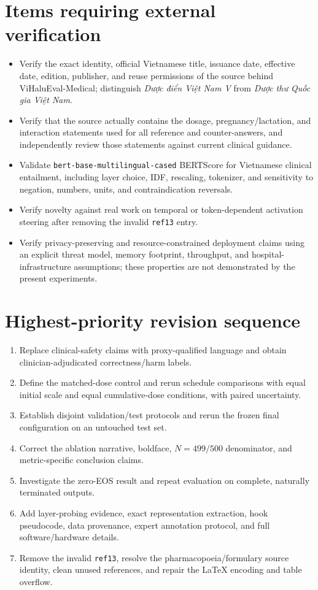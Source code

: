 \documentclass[11pt]{article}
\begin{document}
\section*{Items requiring external verification}

\begin{itemize}
    \item Verify the exact identity, official Vietnamese title, issuance date, effective date, edition, publisher, and reuse permissions of the source behind ViHaluEval-Medical; distinguish \foreignlanguage{vietnamese}{\emph{Dược điển Việt Nam V}} from \foreignlanguage{vietnamese}{\emph{Dược thư Quốc gia Việt Nam}}.
    \item Verify that the source actually contains the dosage, pregnancy/lactation, and interaction statements used for all reference and counter-answers, and independently review those statements against current clinical guidance.
    \item Validate \texttt{bert-base-multilingual-cased} BERTScore for Vietnamese clinical entailment, including layer choice, IDF, rescaling, tokenizer, and sensitivity to negation, numbers, units, and contraindication reversals.
    \item Verify novelty against real work on temporal or token-dependent activation steering after removing the invalid \texttt{ref13} entry.
    \item Verify privacy-preserving and resource-constrained deployment claims using an explicit threat model, memory footprint, throughput, and hospital-infrastructure assumptions; these properties are not demonstrated by the present experiments.
\end{itemize}

\section*{Highest-priority revision sequence}

\begin{enumerate}
    \item Replace clinical-safety claims with proxy-qualified language and obtain clinician-adjudicated correctness/harm labels.
    \item Define the matched-dose control and rerun schedule comparisons with equal initial scale and equal cumulative-dose conditions, with paired uncertainty.
    \item Establish disjoint validation/test protocols and rerun the frozen final configuration on an untouched test set.
    \item Correct the ablation narrative, boldface, $N=499/500$ denominator, and metric-specific conclusion claims.
    \item Investigate the zero-EOS result and repeat evaluation on complete, naturally terminated outputs.
    \item Add layer-probing evidence, exact representation extraction, hook pseudocode, data provenance, expert annotation protocol, and full software/hardware details.
    \item Remove the invalid \texttt{ref13}, resolve the pharmacopoeia/formulary source identity, clean unused references, and repair the LaTeX encoding and table overflow.
\end{enumerate}
\end{document}

